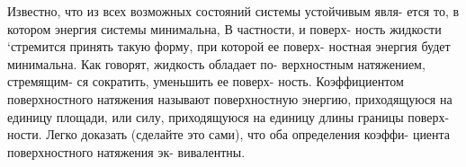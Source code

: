 \begin{multicols}{2}
Известно, что из всех возможных\linebreak
состояний системы устойчивым явля-\linebreak
ется то, в котором энергия системы\linebreak
минимальна, В частности, и поверх-\linebreak
ность жидкости ‘стремится принять\linebreak
такую форму, при которой ее поверх-\linebreak
ностная энергия будет минимальна.\linebreak
Как говорят, жидкость обладает по-\linebreak
верхностным натяжением, стремящим-\linebreak
ся сократить, уменьшить ее поверх-\linebreak
ность. Коэффициентом поверхностного\linebreak
натяжения называют поверхностную\linebreak
энергию, приходящуюся на единицу\linebreak
площади, или силу, приходящуюся\linebreak
на единицу длины границы поверх-\linebreak
ности. Легко доказать (сделайте это\linebreak
сами), что оба определения коэффи-\linebreak
циента поверхностного натяжения эк-\linebreak
вивалентны.

\end{multicols}

